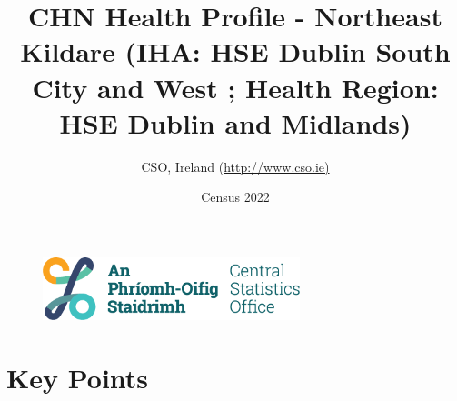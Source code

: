 \documentclass{article}
\title{CHN Health Profile - Northeast Kildare (IHA: HSE Dublin South City and West ;  Health Region: HSE Dublin and Midlands) }
\date{Census 2022}
\author{CSO, Ireland  (\url{http://www.cso.ie)}}
\begin{document}


\begin{figure}
	\centering
\includegraphics[width =75mm]{../figures/CSO_Logo.png}
\end{figure}

				 
		   
						  
														  
																																													
												 
			 
\maketitle
					
													   
				 
						 
																																																																											   
				 
				  
  \pagebreak
    	    \tableofcontents

\pagebreak


\section{Key Points}
\end{document}
